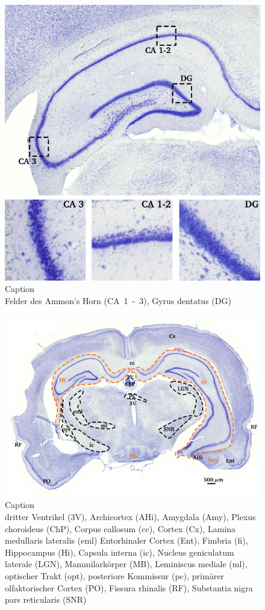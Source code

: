 \documentclass[12pt,a4paper,pdftex]{article}
\begin{document}
\begin{figure}[H]
    \centering
    \includegraphics{pictures/Basalganglia/Hippocampus.png}
    \caption{Caption\\
    Felder des Ammon's Horn (CA~1~-~3), Gyrus dentatus (DG)}
    \label{fig:Hippocampus_zellschicht}
\end{figure}

\begin{figure}[H]
    \centering
    \includegraphics{pictures/Basalganglia/Hippo_uebersicht.png}
    \caption{Caption\\
    dritter Ventrikel (3V), Archicortex (AHi), Amygdala (Amy), Plexus choroideus (ChP), Corpus callosum (cc), Cortex (Cx), Lamina medullaris lateralis (eml) Entorhinaler Cortex (Ent), Fimbria (fi), Hippocampus (Hi), Capsula interna (ic), Nucleus geniculatum laterale (LGN), Mammilarkörper (MB), Leminiscus mediale (ml), optischer Trakt (opt), posteriore Kommissur (pc), primärer  olfaktorischer  Cortex (PO), Fissura rhinalis (RF), Substantia nigra pars reticularis (SNR)}
    \label{fig:hippo_uebersicht}
\end{figure}
\end{document}
